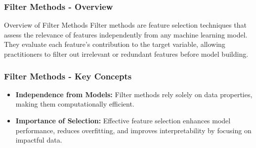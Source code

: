\documentclass[aspectratio=169]{beamer}
\begin{document}
\begin{frame}[fragile]
    \frametitle{Filter Methods - Overview}
    \begin{block}{Overview of Filter Methods}
        Filter methods are feature selection techniques that assess the relevance of features independently from any machine learning model. They evaluate each feature's contribution to the target variable, allowing practitioners to filter out irrelevant or redundant features before model building.
    \end{block}
\end{frame}

\begin{frame}[fragile]
    \frametitle{Filter Methods - Key Concepts}
    \begin{itemize}
        \item \textbf{Independence from Models:} Filter methods rely solely on data properties, making them computationally efficient.
        \item \textbf{Importance of Selection:} Effective feature selection enhances model performance, reduces overfitting, and improves interpretability by focusing on impactful data.
    \end{itemize}
\end{frame}
\end{document}

